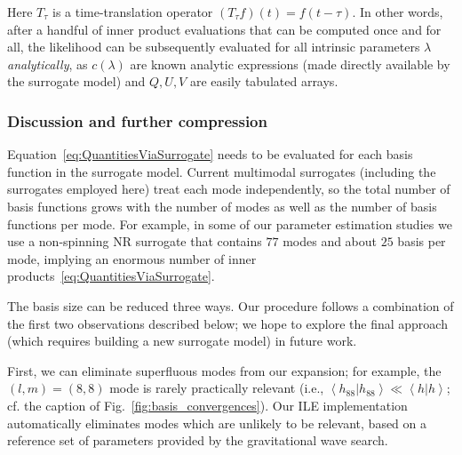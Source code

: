 \documentclass[aps,prd,nofootinbib,showpacs,amssymb,twocolumn]{revtex4}
\newcommand\qmstateproduct[2]{\left<#1|#2\right>}
\begin{document}
Here $T_\tau$ is a time-translation operator $(T_\tau f)(t)=f(t-\tau)$. 
In other words, after a handful of inner product evaluations that can be computed once and for all, the likelihood can be subsequently evaluated for all
intrinsic parameters $\lambda$ \emph{analytically}, as $c(\lambda)$ are known analytic expressions (made directly available by the surrogate model) and $Q,U,V$ are easily tabulated arrays. 
%

\subsubsection{Discussion and further compression}
\label{sec:compression}

Equation~\eqref{eq:QuantitiesViaSurrogate} 
needs to be evaluated for each basis function
%
in the surrogate 
%
model.
Current multimodal surrogates (including the surrogates employed here) treat each mode independently, so the total number of basis functions 
%
grows with the number of modes 
%
%
as well as
the number of basis functions per mode.
For example, in some of our parameter estimation studies we use a non-spinning NR surrogate that contains $77$ modes and about $25$ basis per mode, implying
%
an enormous number of inner products~\eqref{eq:QuantitiesViaSurrogate}.

The basis size can be reduced three ways. Our procedure follows a combination of the first two observations described
 below; we hope to explore the final approach (which requires building a new surrogate model)  in future work.

First, we can eliminate superfluous modes from our expansion; for example, the $(l,m)=(8,8)$ mode is rarely practically
relevant (i.e., $\qmstateproduct{h_{88}}{h_{88}} \ll \qmstateproduct{h}{h}$; cf. the caption of Fig.~\ref{fig:basis_convergences}).  Our ILE implementation automatically eliminates modes which are unlikely to be relevant, based on a reference
set of parameters provided by the gravitational wave search.
%
\end{document}
